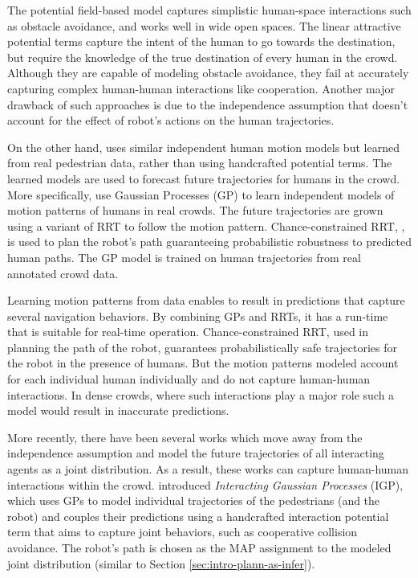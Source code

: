 The potential field-based model captures simplistic human-space interactions such as obstacle avoidance, and works well in wide open spaces. The linear attractive potential terms capture the intent of the human to go towards the destination, but require the knowledge of the true destination of every human in the crowd. Although they are capable of modeling obstacle avoidance, they fail at accurately capturing complex human-human interactions like cooperation. Another major drawback of such approaches is due to the independence assumption that doesn't account for the effect of robot's actions on the human trajectories.

On the other hand, \cite{aoude2013probabilistically} uses similar independent human motion models but learned from real pedestrian data, rather than using handcrafted potential terms. The learned models are used to forecast future trajectories for humans in the crowd. More specifically, \cite{aoude2013probabilistically} use Gaussian Processes (GP) to learn independent models of motion patterns of humans in real crowds. The future trajectories are grown using a variant of RRT to follow the motion pattern. Chance-constrained RRT, \cite{luders10}, is used to plan the robot's path guaranteeing probabilistic robustness to predicted human paths. The GP model is trained on human trajectories from real annotated crowd data.

Learning motion patterns from data enables \cite{aoude2013probabilistically} to result in predictions that capture several navigation behaviors. By combining GPs and RRTs, it has a run-time that is suitable for real-time operation. Chance-constrained RRT, used in planning the path of the robot, guarantees probabilistically safe trajectories for the robot in the presence of humans. But the motion patterns modeled account for each individual human individually and do not capture human-human interactions. In dense crowds, where such interactions play a major role such a model would result in inaccurate predictions.

More recently, there have been several works which move away from the independence assumption and model the future trajectories of all interacting agents as a joint distribution. As a result, these works can capture human-human interactions within the crowd. \cite{trautman15} introduced \textit{Interacting Gaussian Processes} (IGP), which uses GPs to model individual trajectories of the pedestrians (and the robot) and couples their predictions using a handcrafted interaction potential term that aims to capture joint behaviors, such as cooperative collision avoidance. The robot's path is chosen as the MAP assignment to the modeled joint distribution (similar to Section \ref{sec:intro-plann-as-infer}).

